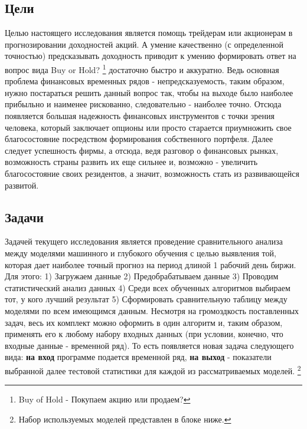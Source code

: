 	\subsection{Цели}
		Целью настоящего исследования является помощь трейдерам или акционерам в прогнозировании доходностей акций. А умение качественно (с определенной точностью) предсказывать доходность приводит к умению формировать ответ на вопрос вида Buy or Hold? \footnote{Buy of Hold - Покупаем акцию или продаем?} достаточно быстро и аккуратно. Ведь основная проблема финансовых временных рядов - непредсказуемость, таким образом, нужно постараться решить данный вопрос так, чтобы на выходе было наиболее прибыльно и наименее рискованно, следовательно - наиболее точно. Отсюда появляется большая надежность финансовых инструментов с точки зрения человека, который заключает опционы или просто старается приумножить свое благосостояние посредством формирования собственного портфеля. Далее следует успешность фирмы, а отсюда, ведя разговор о финансовых рынках, возможность страны развить их еще сильнее и, возможно - увеличить благосостояние своих резидентов, а значит, возможность стать из развивающейся развитой. 
	\subsection{Задачи}
		Задачей текущего исследования является проведение сравнительного анализа между моделями машинного и глубокого обучения с целью выявления той, которая дает наиболее точный прогноз на период длиной 1 рабочий день биржи. Для этого: 1) Загружаем данные 2) Предобрабатываем данные 3) Проводим статистический анализ данных 4) Среди всех обученных алгоритмов выбираем тот, у кого лучший результат 5) Сформировать сравнительную таблицу между моделями по всем имеющимся данным. Несмотря на громоздкость поставленных задач, весь их комплект можно оформить в один алгоритм и, таким образом, применять его к любому набору входных данных (при условии, конечно, что входные данные - временной ряд). То есть появляется новая задача следующего вида: \textbf{на вход} программе подается временной ряд, \textbf{на выход} - показатели выбранной далее  тестовой статистики для каждой из рассматриваемых моделей. \footnote{Набор используемых моделей представлен в блоке ниже.}                  